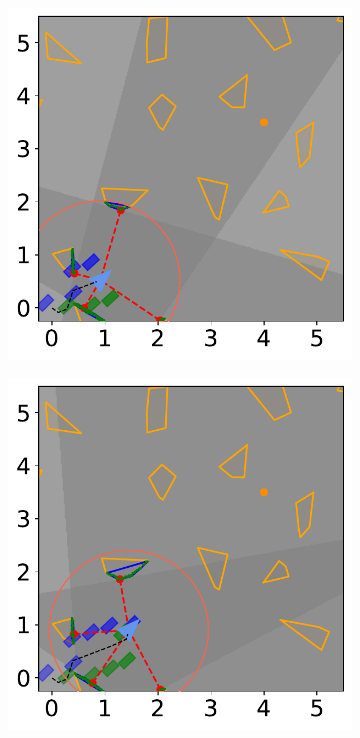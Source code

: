 \begin{figure}[H]
    \begin{subfigure}{0.30\textwidth}
        \centering
        \includegraphics[width=\textwidth]{figures/Simulations/sim2unkenv/frame_2.pdf}
    \end{subfigure}%
    \hspace{1em}
    \begin{subfigure}{0.30\textwidth}
        \centering
        \includegraphics[width=\textwidth]{figures/Simulations/sim2unkenv/frame_3.pdf}
    \end{subfigure}%


\end{figure}
